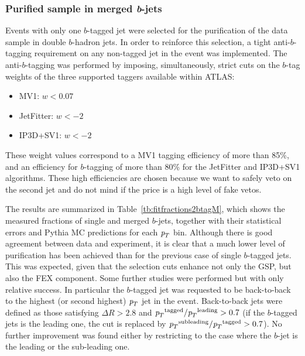 \subsubsection{Purified sample in merged {\em b}-jets}

Events with only one $b$-tagged jet were selected for the purification of the data sample in double $b$-hadron jets.  In order to reinforce this selection, a tight anti-$b$-tagging requirement on any non-tagged jet in the event was implemented.  The anti-$b$-tagging was performed by imposing, simultaneously, strict cuts on the $b$-tag weights of the three supported taggers available within ATLAS:
%
\begin{itemize}
\item
MV1:  $w < 0.07$  
\item
JetFitter:  $w < -2$
\item
IP3D+SV1:  $w < -2$
\end{itemize}
%
These weight values correspond to a MV1 tagging efficiency of more than 85\%, and an efficiency for $b$-tagging of more than 80\% for the JetFitter and IP3D+SV1 algorithms. These high efficiencies are chosen because we want to safely veto on the second jet and do not mind if the price is a high level of fake vetos. %


The results are summarized in Table~\ref{tb:fitfractions2btagM}, which shows the measured fractions of single and merged $b$-jets, together with their statistical errors and {\sc Pythia} MC predictions for each ${\emph{p}_{T}}$ bin. Although there is good agreement between data and experiment, it is clear that a much lower level of purification has been achieved than for the previous case of single $b$-tagged jets. This was expected, given that the selection cuts enhance not only the GSP, but also the FEX component. 
Some further studies were performed but with only relative success. In particular the $b$-tagged jet was requested to be back-to-back to the highest (or second highest) ${\emph{p}_{T}}$ jet in the event.  Back-to-back jets were defined as those satisfying  $\Delta R>2.8$ and  ${\emph{p}_{T}}^\text{tagged}/{\emph{p}_{T}}^\text{leading} > 0.7$  (if the $b$-tagged jets is the leading one, the cut is replaced by ${\emph{p}_{T}}^\text{subleading}/{\emph{p}_{T}}^\text{tagged} > 0.7$). No further  improvement was found either by restricting to the case where the $b$-jet is the leading or the sub-leading one.

